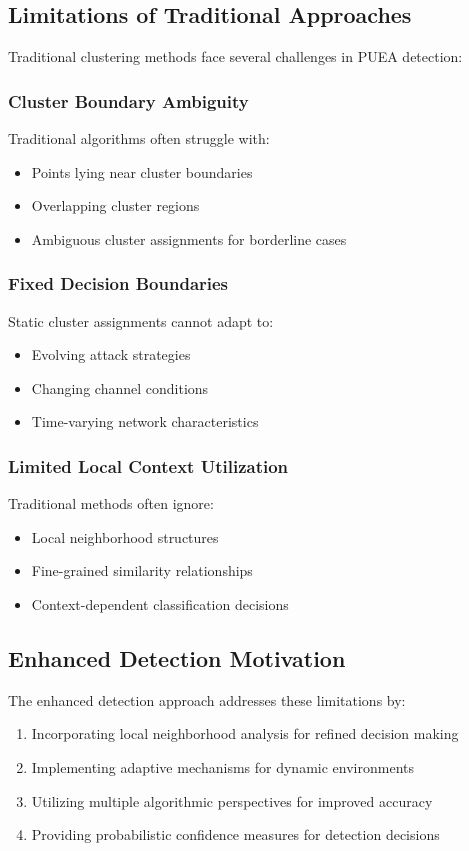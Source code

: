 \subsection{Limitations of Traditional Approaches}
Traditional clustering methods face several challenges in PUEA detection:

\subsubsection{Cluster Boundary Ambiguity}
Traditional algorithms often struggle with:
\begin{itemize}
\item Points lying near cluster boundaries
\item Overlapping cluster regions
\item Ambiguous cluster assignments for borderline cases
\end{itemize}

\subsubsection{Fixed Decision Boundaries}
Static cluster assignments cannot adapt to:
\begin{itemize}
\item Evolving attack strategies
\item Changing channel conditions
\item Time-varying network characteristics
\end{itemize}

\subsubsection{Limited Local Context Utilization}
Traditional methods often ignore:
\begin{itemize}
\item Local neighborhood structures
\item Fine-grained similarity relationships
\item Context-dependent classification decisions
\end{itemize}

\subsection{Enhanced Detection Motivation}
The enhanced detection approach addresses these limitations by:
\begin{enumerate}
\item Incorporating local neighborhood analysis for refined decision making
\item Implementing adaptive mechanisms for dynamic environments
\item Utilizing multiple algorithmic perspectives for improved accuracy
\item Providing probabilistic confidence measures for detection decisions
\end{enumerate}

